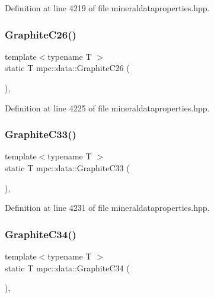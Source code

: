 Definition at line 4219 of file mineraldataproperties.\+hpp.

\mbox{\label{namespacempc_1_1data_a8a038df138f6aff4ae28dc88e2281307}} 
\subsubsection{\texorpdfstring{Graphite\+C26()}{GraphiteC26()}}
{\footnotesize\ttfamily template$<$typename T $>$ \\
static T mpc\+::data\+::\+Graphite\+C26 (\begin{DoxyParamCaption}{ }\end{DoxyParamCaption})\hspace{0.3cm}{\ttfamily [inline]}, {\ttfamily [static]}}



Definition at line 4225 of file mineraldataproperties.\+hpp.

\mbox{\label{namespacempc_1_1data_a84dbadf0d0d8f6abb5386581636d41f9}} 
\subsubsection{\texorpdfstring{Graphite\+C33()}{GraphiteC33()}}
{\footnotesize\ttfamily template$<$typename T $>$ \\
static T mpc\+::data\+::\+Graphite\+C33 (\begin{DoxyParamCaption}{ }\end{DoxyParamCaption})\hspace{0.3cm}{\ttfamily [inline]}, {\ttfamily [static]}}



Definition at line 4231 of file mineraldataproperties.\+hpp.

\mbox{\label{namespacempc_1_1data_a485935138ffb575847d389484893b71f}} 
\subsubsection{\texorpdfstring{Graphite\+C34()}{GraphiteC34()}}
{\footnotesize\ttfamily template$<$typename T $>$ \\
static T mpc\+::data\+::\+Graphite\+C34 (\begin{DoxyParamCaption}{ }\end{DoxyParamCaption})\hspace{0.3cm}{\ttfamily [inline]}, {\ttfamily [static]}}



